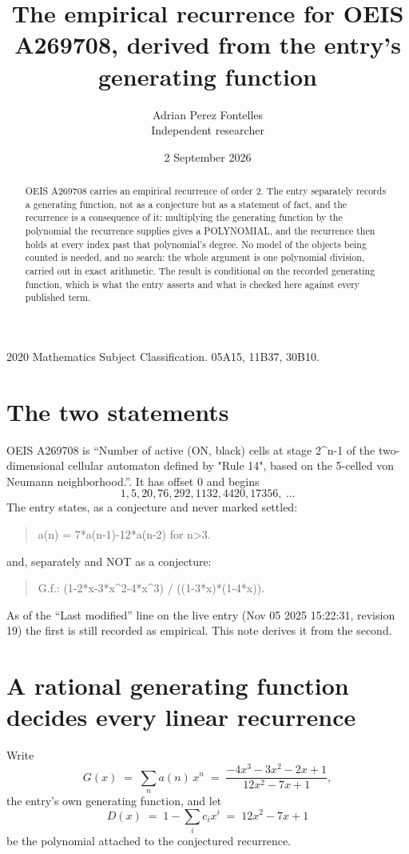 \documentclass[11pt,a4paper]{article}
\title{The empirical recurrence for OEIS A269708, derived from the entry's generating function}
\author{Adrian Perez Fontelles\\ \small Independent researcher}
\date{2 September 2026}
\theoremstyle{plain}
\theoremstyle{definition}
\begin{document}
\maketitle

\begin{abstract}
OEIS A269708 carries an empirical recurrence of order $2$. The entry separately records a
generating function, not as a conjecture but as a statement of fact, and the recurrence is a
consequence of it: multiplying the generating function by the polynomial the recurrence
supplies gives a POLYNOMIAL, and the recurrence then holds at every index past that
polynomial's degree. No model of the objects being counted is needed, and no search: the
whole argument is one polynomial division, carried out in exact arithmetic. The result is
conditional on the recorded generating function, which is what the entry asserts and what is
checked here against every published term.
\end{abstract}

\noindent\small 2020 Mathematics Subject Classification. 05A15, 11B37, 30B10.\normalsize

\section{The two statements}

OEIS A269708 is ``Number of active (ON, black) cells at stage 2\^{}n-1 of the two-dimensional cellular automaton defined by "Rule 14", based on the 5-celled von Neumann neighborhood.''. It has offset $0$ and begins
\[
1, 5, 20, 76, 292, 1132, 4420, 17356,\ \dots
\]
The entry states, as a conjecture and never marked settled:
\begin{quote}
a(n) = 7*a(n-1)-12*a(n-2) for n>3.
\end{quote}
and, separately and NOT as a conjecture:
\begin{quote}
G.f.: (1-2*x-3*x\^{}2-4*x\^{}3) / ((1-3*x)*(1-4*x)).
\end{quote}
As of the ``Last modified'' line on the live entry (Nov 05 2025 15:22:31, revision 19) the first is still
recorded as empirical. This note derives it from the second.

\section{A rational generating function decides every linear recurrence}

Write
\[
G(x)\;=\;\sum_{n}a(n)\,x^{n}\;=\;\frac{- 4 x^{3} - 3 x^{2} - 2 x + 1}{12 x^{2} - 7 x + 1},
\]
the entry's own generating function, and let
\[
D(x)\;=\;1-\sum_i c_i x^{i}\;=\;12 x^{2} - 7 x + 1
\]
be the polynomial attached to the conjectured recurrence.
\end{document}
